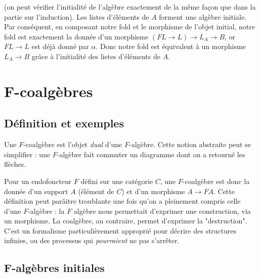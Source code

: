 \documentclass{article}
\begin{document}
(on peut vérifier l'initialité de l'algèbre exactement de la même façon que dans la partie sur l'induction). Les listes d'éléments de $A$ forment une algèbre initiale. Par conséquent, en composant notre fold et le morphisme de l'objet initial, notre fold est exactement la donnée  d'un morphisme $(FL \rightarrow L) \rightarrow L_A \rightarrow B $, or $FL \rightarrow L$ est déjà donné par $\alpha$. Donc notre fold est équivalent à un morphisme $L_A \rightarrow B$ grâce à l'initialité des listes d'éléments de $A$.


\section{F-coalgèbres}

\subsection{Définition et exemples}

Une $F$-coalgèbre est l'objet \textit{dual} d'une $F$-algèbre. Cette notion abstraite peut se simplifier : une $F$-algèbre fait commuter un diagramme dont on a retourné les flèches.

\begin{center}
\end{center}

Pour un endofoncteur $F$ défini sur une catégorie $C$, une $F$-coalgèbre est donc la donnée d'un support $A$ (élément de $C$) et d'un morphisme $A \rightarrow FA$. Cette définition peut parâitre troublante une fois qu'on a pleinement compris celle d'une $F$-algèbre : la $F$ algèbre nous permettait d'exprimer une construction, via un morphisme. La coalgèbre, au contraire, permet d'exprimer la "destruction". C'est un formalisme particulièrement approprié  pour décrire des structures infinies, ou des processus qui \textit{pourraient} ne pas s'arrêter.

\subsection{F-algèbres initiales}
\end{document}
